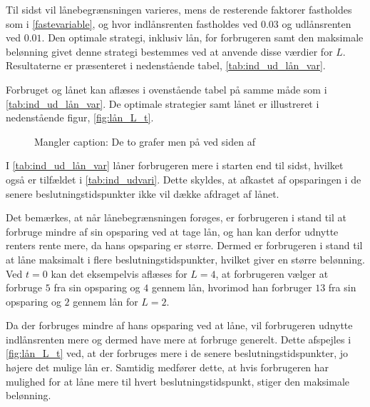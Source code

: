 Til sidst vil lånebegrænsningen varieres, mens de resterende faktorer fastholdes som i \eqref{fastevariable}, og hvor indlånsrenten fastholdes ved $0.03$ og udlånsrenten ved $0.01$. Den optimale strategi, inklusiv lån, for forbrugeren samt den maksimale belønning givet denne strategi bestemmes ved at anvende disse værdier for $L$. Resultaterne er præsenteret i nedenstående tabel, \autoref{tab:ind_ud_lån_var}.



Forbruget og lånet kan aflæses i ovenstående tabel på samme måde som i \autoref{tab:ind_ud_lån_var}. De optimale strategier samt lånet er illustreret i nedenstående figur, \autoref{fig:lån_L_t}.

\begin{figure}[H]
    \begin{center}
        \resizebox{8cm}{!}{}
        \resizebox{8cm}{!}{}
    \end{center}
    \caption{Mangler caption: De to grafer men på ved siden af }\label{fig:lån_L_t}
\end{figure}

I \autoref{tab:ind_ud_lån_var} låner forbrugeren mere i starten end til sidst, hvilket også er tilfældet i \autoref{tab:ind_udvari}. Dette skyldes, at afkastet af opsparingen i de senere beslutningstidspunkter ikke vil dække afdraget af lånet. 

Det bemærkes, at når lånebegrænsningen forøges, er forbrugeren i stand til at forbruge mindre af sin opsparing ved at tage lån, og han kan derfor udnytte renters rente mere, da hans opsparing er større. Dermed er forbrugeren i stand til at låne maksimalt i flere beslutningstidspunkter, hvilket giver en større belønning. Ved $t=0$ kan det eksempelvis aflæses for $L=4$, at forbrugeren vælger at forbruge $5$ fra sin opsparing og $4$ gennem lån, hvorimod han forbruger $13$ fra sin opsparing og $2$ gennem lån for $L=2$. 

Da der forbruges mindre af hans opsparing ved at låne, vil forbrugeren udnytte indlånsrenten mere og dermed have mere at forbruge generelt. Dette afspejles i \autoref{fig:lån_L_t} ved, at der forbruges mere i de senere beslutningstidspunkter, jo højere det mulige lån er. Samtidig medfører dette, at hvis forbrugeren har mulighed for at låne mere til hvert beslutningstidspunkt, stiger den maksimale belønning. 


